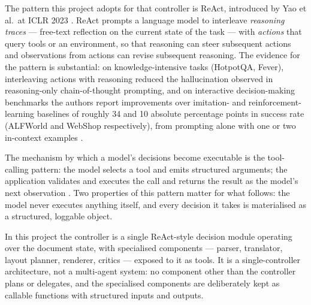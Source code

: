 The pattern this project adopts for that controller is ReAct,
introduced by Yao et al.\ at ICLR 2023 \cite{yao2023react}. ReAct
prompts a language model to interleave \emph{reasoning traces} ---
free-text reflection on the current state of the task --- with
\emph{actions} that query tools or an environment, so that reasoning
can steer subsequent actions and observations from actions can revise
subsequent reasoning. The evidence for the pattern is substantial: on
knowledge-intensive tasks (HotpotQA, Fever), interleaving actions with
reasoning reduced the hallucination observed in reasoning-only
chain-of-thought prompting, and on interactive decision-making
benchmarks the authors report improvements over imitation- and
reinforcement-learning baselines of roughly 34 and 10 absolute
percentage points in success rate (ALFWorld and WebShop respectively),
from prompting alone with one or two in-context examples
\cite{yao2023react}.

The mechanism by which a model's decisions become executable is the
tool-calling pattern: the model selects a tool and emits structured
arguments; the application validates and executes the call and returns
the result as the model's next observation
\cite{openai_function_calling}. Two properties of this pattern matter
for what follows: the model never executes anything itself, and every
decision it takes is materialised as a structured, loggable object.

In this project the controller is a single ReAct-style decision module
operating over the document state, with specialised components ---
parser, translator, layout planner, renderer, critics --- exposed to
it as tools. It is a single-controller architecture, not a multi-agent
system: no component other than the controller plans or delegates, and
the specialised components are deliberately kept as callable functions
with structured inputs and outputs.

